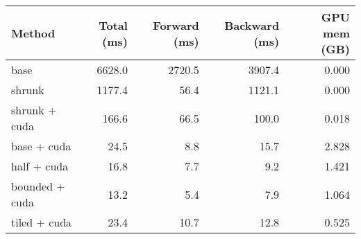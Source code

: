 \begin{tabular}{lrrrr}
\hline
 Method         &   Total (ms) &   Forward (ms) &   Backward (ms) &   GPU mem (GB) \\
\hline
 base           &       6628.0 &         2720.5 &          3907.4 &          0.000 \\
 shrunk         &       1177.4 &           56.4 &          1121.1 &          0.000 \\
 shrunk + cuda  &        166.6 &           66.5 &           100.0 &          0.018 \\
 base + cuda    &         24.5 &            8.8 &            15.7 &          2.828 \\
 half + cuda    &         16.8 &            7.7 &             9.2 &          1.421 \\
 bounded + cuda &         13.2 &            5.4 &             7.9 &          1.064 \\
 tiled + cuda   &         23.4 &           10.7 &            12.8 &          0.525 \\
\hline
\end{tabular}
